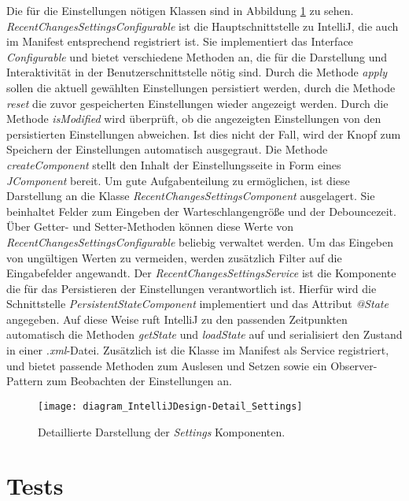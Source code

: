 Die für die Einstellungen nötigen Klassen sind in Abbildung
\ref{fig:diagram_IntelliJDesign-Detail_Settings} zu sehen.
\emph{RecentChangesSettingsConfigurable} ist die Hauptschnittstelle 
zu IntelliJ, die auch im Manifest entsprechend registriert ist. 
Sie implementiert das Interface \emph{Configurable}
und bietet verschiedene Methoden an, die für die Darstellung
und Interaktivität in der Benutzerschnittstelle nötig sind.
Durch die Methode \emph{apply} sollen die aktuell gewählten Einstellungen
persistiert werden, durch die Methode \emph{reset} die 
zuvor gespeicherten Einstellungen wieder angezeigt werden.
Durch die Methode \emph{isModified} wird überprüft, ob die angezeigten
Einstellungen von den persistierten Einstellungen abweichen. 
Ist dies nicht der Fall, wird der Knopf zum Speichern der Einstellungen
automatisch ausgegraut. Die Methode \emph{createComponent} stellt
den Inhalt der Einstellungsseite in Form eines \emph{JComponent} bereit.
Um gute Aufgabenteilung zu ermöglichen, ist diese Darstellung an die 
Klasse \emph{RecentChangesSettingsComponent} ausgelagert. Sie beinhaltet
Felder zum Eingeben der Warteschlangengröße und der Debouncezeit.
Über Getter- und Setter-Methoden können diese Werte von 
\emph{RecentChangesSettingsConfigurable} beliebig verwaltet werden.
Um das Eingeben von ungültigen Werten zu vermeiden, werden zusätzlich
Filter auf die Eingabefelder angewandt.
Der \emph{RecentChangesSettingsService} ist die Komponente die für das 
Persistieren der Einstellungen verantwortlich ist. Hierfür
wird die Schnittstelle \emph{PersistentStateComponent} implementiert
und das Attribut \emph{@State} angegeben. Auf diese Weise ruft
IntelliJ zu den passenden Zeitpunkten automatisch die Methoden
\emph{getState} und \emph{loadState} auf und serialisiert den Zustand
in einer \emph{.xml}-Datei.
Zusätzlich ist die Klasse im Manifest als Service registriert, und bietet
passende Methoden zum Auslesen und Setzen sowie ein Observer-Pattern
zum Beobachten der Einstellungen an.

\begin{figure}
    \centering
    \texttt{[image: diagram\_IntelliJDesign-Detail\_Settings]}
    \caption{Detaillierte Darstellung der \emph{Settings} Komponenten.}
    \label{fig:diagram_IntelliJDesign-Detail_Settings}
\end{figure}

\section{Tests}
\label{sec:EntwicklungIntelliJ_Tests}

